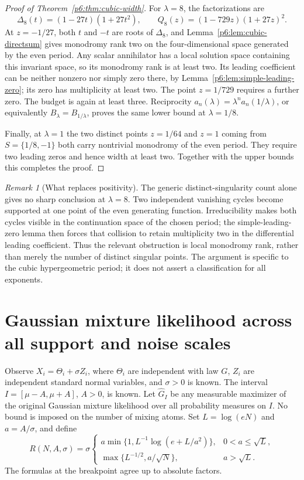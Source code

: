 \documentclass[11pt,a4paper]{article}
\theoremstyle{definition}
\theoremstyle{remark}
\newtheorem{remark}[theorem]{Remark}
\numberwithin{equation}{section}
\begin{document}
\begin{proof}[Proof of Theorem~\ref{p6:thm:cubic-width}]
For $\lambda=8$, the factorizations are
\[
 \Delta_8(t)=(1-27t)(1+27t^2),\qquad
 Q_8(z)=(1-729z)(1+27z)^2.
\]
At $z=-1/27$, both $t$ and $-t$ are roots of $\Delta_8$, and
Lemma~\ref{p6:lem:cubic-directsum} gives monodromy rank two on the
four-dimensional space generated by the even period. Any scalar
annihilator has a local solution space containing this invariant
space, so its monodromy rank is at least two. Its leading coefficient
can be neither nonzero nor simply zero there, by
Lemma~\ref{p6:lem:simple-leading-zero}; its zero has multiplicity at
least two. The point $z=1/729$ requires a further zero. The budget is
again at least three. Reciprocity
$a_n(\lambda)=\lambda^na_n(1/\lambda)$, or equivalently
$B_\lambda=B_{1/\lambda}$, proves the same lower bound at $\lambda=1/8$.

Finally, at $\lambda=1$ the two distinct points $z=1/64$ and $z=1$
coming from $S=\{1/8,-1\}$ both carry nontrivial monodromy of the even
period. They require two leading zeros and hence width at least two.
Together with the upper bounds this completes the proof.
\end{proof}

\begin{remark}[What replaces positivity]
The generic distinct-singularity count alone gives no sharp conclusion
at $\lambda=8$. Two independent vanishing cycles become supported at
one point of the even generating function. Irreducibility makes both
cycles visible in the continuation space of the chosen period;
the simple-leading-zero lemma then forces that collision to retain
multiplicity two in the differential leading coefficient. Thus the
relevant obstruction is local monodromy rank, rather than merely the
number of distinct singular points. The argument is specific to the
cubic hypergeometric period; it does not assert a classification for
all exponents.
\end{remark}


\clearpage

\section{Gaussian mixture likelihood across all support and noise scales}
\label{p6:gf:section}

Observe $X_i=\Theta_i+\sigma Z_i$, where $\Theta_i$ are independent
with law $G$, $Z_i$ are independent standard normal variables, and
$\sigma>0$ is known.  The interval $I=[\mu-A,\mu+A]$, $A>0$, is
known.  Let $\widehat G_I$ be any measurable maximizer of the original
Gaussian mixture likelihood over all probability measures on $I$.
No bound is imposed on the number of mixing atoms.  Set
$L=\log(eN)$ and $a=A/\sigma$, and define
\begin{equation}\label{p6:gf:rate}
 R(N,A,\sigma)=\sigma\begin{cases}
 a\min\{1,L^{-1}\log(e+L/a^2)\},&0<a\le\sqrt L,\\[1mm]
 \max\{L^{-1/2},a/\sqrt N\},&a>\sqrt L.
 \end{cases}
\end{equation}
The formulas at the breakpoint agree up to absolute factors.
\end{document}
